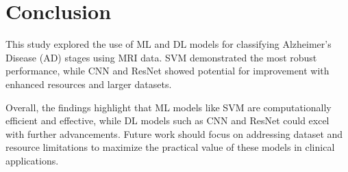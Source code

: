 \documentclass[runningheads]{llncs}
\begin{document}
\section{Conclusion}

This study explored the use of ML and DL models for classifying Alzheimer’s Disease (AD) stages using MRI data. SVM demonstrated the most robust performance, while CNN and ResNet showed potential for improvement with enhanced resources and larger datasets.

Overall, the findings highlight that ML models like SVM are computationally efficient and effective, while DL models such as CNN and ResNet could excel with further advancements. Future work should focus on addressing dataset and resource limitations to maximize the practical value of these models in clinical applications.



\sloppy


\end{document}
